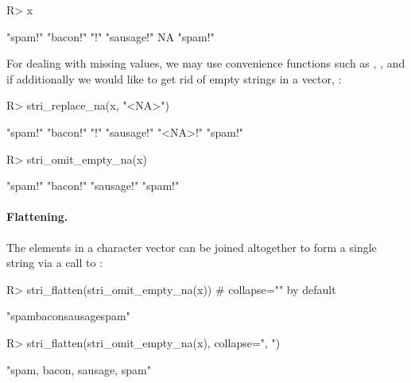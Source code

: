 \documentclass[nojss]{jss}
\begin{document}
\begin{Schunk}
\begin{Sinput}
R> x %s+% "!"
\end{Sinput}
\begin{Soutput}
[1] "spam!"    "bacon!"   "!"        "sausage!" NA         "spam!"
\end{Soutput}
\end{Schunk}

\noindent
For dealing with missing values, we may use convenience functions such as
, ,
and
 if additionally we would like to get rid
of empty strings in a vector,
:


\begin{Schunk}
\begin{Sinput}
R> stri_replace_na(x, "<NA>") %s+% "!"
\end{Sinput}
\begin{Soutput}
[1] "spam!"    "bacon!"   "!"        "sausage!" "<NA>!"    "spam!"
\end{Soutput}
\begin{Sinput}
R> stri_omit_empty_na(x) %s+% "!"
\end{Sinput}
\begin{Soutput}
[1] "spam!"    "bacon!"   "sausage!" "spam!"
\end{Soutput}
\end{Schunk}


\paragraph{Flattening.}
The elements in a character vector can be joined altogether to
form a single string via a call to  :

\begin{Schunk}
\begin{Sinput}
R> stri_flatten(stri_omit_empty_na(x))  # collapse="" by default
\end{Sinput}
\begin{Soutput}
[1] "spambaconsausagespam"
\end{Soutput}
\begin{Sinput}
R> stri_flatten(stri_omit_empty_na(x), collapse=", ")
\end{Sinput}
\begin{Soutput}
[1] "spam, bacon, sausage, spam"
\end{Soutput}
\end{Schunk}
\end{document}
